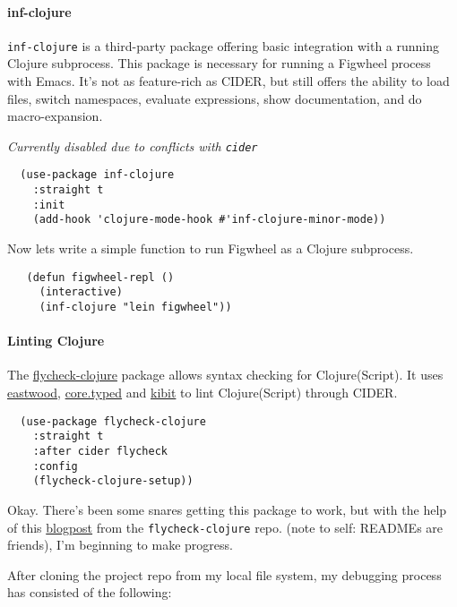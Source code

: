 \documentclass[11pt]{article}
\begin{document}
\paragraph*{inf-clojure}
\label{sec:orgff98f24}

\texttt{inf-clojure} is a third-party package offering basic integration
with a running Clojure subprocess. This package is necessary for
running a Figwheel process with Emacs.
It's not as feature-rich as CIDER, but still offers the ability
to load files, switch namespaces, evaluate expressions, show documentation,
and do macro-expansion.

\emph{Currently disabled due to conflicts with \texttt{cider}}

\begin{verbatim}
  (use-package inf-clojure
    :straight t
    :init
    (add-hook 'clojure-mode-hook #'inf-clojure-minor-mode))
\end{verbatim}

Now lets write a simple function to run Figwheel as a Clojure
subprocess.

\begin{verbatim}
   (defun figwheel-repl ()
     (interactive)
     (inf-clojure "lein figwheel"))
\end{verbatim}

\paragraph*{Linting Clojure}
\label{sec:org9d39366}

The \href{https://github.com/clojure-emacs/squiggly-clojure}{flycheck-clojure} package allows syntax checking for Clojure(Script).
It uses \href{https://github.com/jonase/eastwood}{eastwood}, \href{http://typedclojure.org/}{core.typed} and \href{https://github.com/jonase/kibit}{kibit} to lint Clojure(Script) through CIDER.


\begin{verbatim}
  (use-package flycheck-clojure
    :straight t
    :after cider flycheck
    :config
    (flycheck-clojure-setup))
\end{verbatim}

Okay. There's been some snares getting this package to work, but with
the help of this \href{http://blog.podsnap.com/squiggly.html}{blogpost} from the \texttt{flycheck-clojure} repo. (note to
self: READMEs are friends), I'm beginning to make progress.

After cloning the project repo from my local file system, my debugging
process has consisted of the following:
\end{document}
